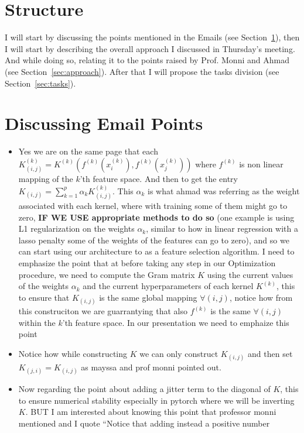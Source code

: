 \documentclass[12pt]{article}
\begin{document}
\section*{Structure}
I will start by discussing the points mentioned in the Emails (see Section~\ref{sec:email-points}), then 
I will start by describing the overall approach I discussed in Thursday's meeting. And while doing so, relating it to the points raised by Prof. Monni and Ahmad (see Section~\ref{sec:approach}).  After that I will propose the tasks division (see Section~\ref{sec:tasks}).

\section{Discussing Email Points}
\label{sec:email-points}
\begin{itemize}
  \item Yes we are on the same page that each $K_{(i,j)}^{(k)} = K^{(k)}(f^{(k)}(x_i^{(k)}), f^{(k)}(x_j^{(k)}))$ where $f^{(k)}$ is non linear mapping of the $k$'th feature space. And then to get the entry $K_{(i,j)}= \sum_{k=1}^{p} \alpha_k K_{(i,j)}^{(k)}$. This $\alpha_k$ is what ahmad was referring as the weight associated with each kernel, where with training some of them might go to zero, \textbf{IF WE USE appropriate methods to do so} (one example is using L1 regularization on the weights $\alpha_k$, similar to how in linear regression with a lasso penalty some of the weights of the features can go to zero), and so we can start using our architecture to as a feature selection algorithm. I need to emphasize the point that at before taking any step in our Optimization procedure, we need to compute the Gram matrix $K$ using the current values of the weights $\alpha_k$ and the current hyperparameters of each kernel $K^{(k)}$, this to ensure that $K_{(i,j)}$ is the same global mapping $\forall (i,j)$, notice how from this construciton we are guarrantying that also $f^{(k)}$ is the same $\forall (i,j)$ within the $k$'th feature space. In our presentation we need to emphaize this point
  \item Notice how while constructing $K$ we can only construct $K_{(i,j)}$ and then set $K_{(j,i)} = K_{(i,j)}$ as mayssa and prof monni pointed out. 
  \item Now regarding the point about adding a jitter term to the diagonal of $K$, this to ensure numerical stability especially in pytorch where we will be inverting $K$. BUT I am interested about knowing this point that professor monni mentioned and I quote ``Notice that adding instead a positive  number

\end{itemize}
\end{document}

